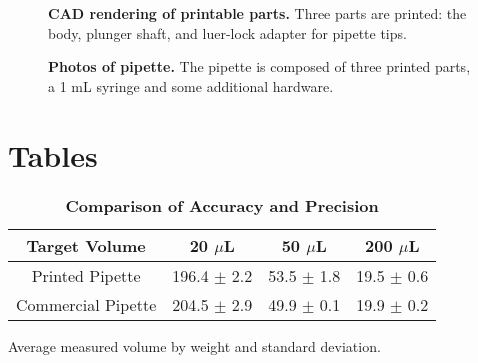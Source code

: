 \begin{figure}
\caption{
{\bf CAD rendering of printable parts.}  Three parts are printed: the body, plunger shaft, and luer-lock adapter for pipette tips.
}
\label{CAD-render-figure}
\end{figure}

\begin{figure}
\caption{
{\bf Photos of pipette.}  The pipette is composed of three printed parts, a 1 mL syringe and some additional hardware.  
}
\label{photo-parts-figure}
\end{figure}



\section*{Tables}
% 
%
%

\begin{table}[!ht]
\caption{
\bf{Comparison of Accuracy and Precision}}
\begin{tabular}{|c|c|c|c|}
\hline
    Target Volume & 20 $\mu$L & 50 $\mu$L & 200 $\mu$L  \\
    \hline
    Printed Pipette & 196.4 $\pm$ 2.2 & 53.5 $\pm$ 1.8 & 19.5 $\pm$ 0.6 \\
    Commercial Pipette & 204.5 $\pm$ 2.9 & 49.9 $\pm$ 0.1 & 19.9 $\pm$ 0.2 \\
    \hline
\end{tabular}
\begin{flushleft} Average measured volume by weight and standard deviation.
\end{flushleft}
\label{tab:comp}
 \end{table}

